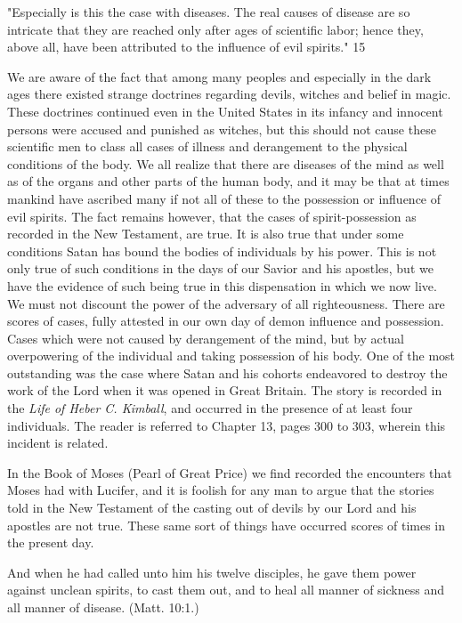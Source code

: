 "Especially is this the case with diseases. The real causes of disease are so intricate that they
are reached only after ages of scientific labor; hence they, above all, have been attributed to
the influence of evil spirits." 15

We are aware of the fact that among many peoples and especially in the dark ages there
existed strange doctrines regarding devils, witches and belief in magic. These doctrines
continued even in the United States in its infancy and innocent persons were accused and
punished as witches, but this should not cause these scientific men to class all cases of illness
and derangement to the physical conditions of the body. We all realize that there are diseases
of the mind as well as of the organs and other parts of the human body, and it may be that at
times mankind have ascribed many if not all of these to the possession or influence of evil
spirits. The fact remains however, that the cases of spirit-possession as recorded in the New
Testament, are true. It is also true that under some conditions Satan has bound the bodies of
individuals by his power. This is not only true of such conditions in the days of our Savior
and his apostles, but we have the evidence of such being true in this dispensation in which we
now live. We must not discount the power of the adversary of all righteousness. There are
scores of cases, fully attested in our own day of demon influence and possession. Cases
which were not caused by derangement of the mind, but by actual overpowering of the
individual and taking possession of his body. One of the most outstanding was the case
where Satan and his cohorts endeavored to destroy the work of the Lord when it was opened
in Great Britain. The story is recorded in the \textit{Life of Heber C. Kimball}, and occurred in the
presence of at least four individuals. The reader is referred to Chapter 13, pages 300 to 303,
wherein this incident is related.

In the Book of Moses (Pearl of Great Price) we find recorded the encounters that Moses had
with Lucifer, and it is foolish for any man to argue that the stories told in the New Testament
of the casting out of devils by our Lord and his apostles are not true. These same sort of
things have occurred scores of times in the present day.

And when he had called unto him his twelve disciples, he gave them power against unclean
spirits, to cast them out, and to heal all manner of sickness and all manner of disease. (Matt.
10:1.)


